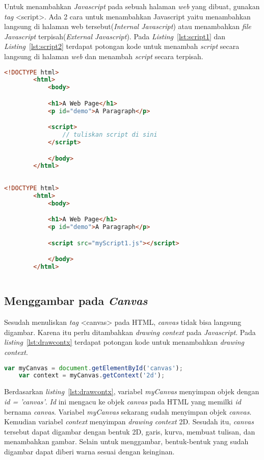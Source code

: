 Untuk menambahkan \textit{Javascript} pada sebuah halaman \textit{web} yang dibuat, gunakan \textit{tag} <script>. Ada 2 cara untuk menambahkan Javascript yaitu menambahkan langsung di halaman web tersebut(\textit{Internal Javascript}) atau menambahkan \textit{file Javascript} terpisah(\textit{External Javascript}). Pada \textit{Listing}~\ref{lst:script1} dan \textit{Listing}~\ref{lst:script2} terdapat potongan kode untuk menambah \textit{script} secara langsung di halaman \textit{web} dan menambah \textit{script} secara terpisah.

\begin{lstlisting}[language=HTML, caption=\textit{Internal Javascript}, label={lst:script1}]
	<!DOCTYPE html>
		<html>
			<body> 

			<h1>A Web Page</h1>
			<p id="demo">A Paragraph</p>

			<script>
				// tuliskan script di sini
			</script>

			</body>
		</html>
		
\end{lstlisting}

\begin{lstlisting}[language=HTML, caption=\textit{External Javascript}, label={lst:script2}]
	<!DOCTYPE html>
		<html>
			<body> 

			<h1>A Web Page</h1>
			<p id="demo">A Paragraph</p>

			<script src="myScript1.js"></script>

			</body>
		</html>
	
\end{lstlisting}

\subsection{Menggambar pada \textit{Canvas}}
Sesudah menuliskan \textit{tag} <canvas> pada HTML, \textit{canvas} tidak bisa langsung digambar. Karena itu perlu ditambahkan \textit{drawing context} pada \textit{Javascript}. Pada \textit{listing}~\ref{lst:drawcontx} terdapat potongan kode untuk menambahkan \textit{drawing context}.

\begin{lstlisting}[language=Javascript, caption=Menambahkan \textit{drawing context canvas}, label={lst:drawcontx} ]
	var myCanvas = document.getElementById('canvas');
	var context = myCanvas.getContext('2d');
\end{lstlisting}

Berdasarkan \textit{listing}~\ref{lst:drawcontx}, variabel \textit{myCanvas} menyimpan objek dengan \textit{id = 'canvas'}. \textit{Id} ini mengacu ke objek \textit{canvas} pada HTML yang memilki \textit{id} bernama \textit{canvas}. Variabel \textit{myCanvas} sekarang sudah menyimpan objek \textit{canvas}. Kemudian variabel \textit{context} menyimpan \textit{drawing context} 2D. Sesudah itu, \textit{canvas} tersebut dapat digambar dengan bentuk 2D, garis, kurva, membuat tulisan, dan menambahkan gambar. Selain untuk menggambar, bentuk-bentuk yang sudah digambar dapat diberi warna sesuai dengan keinginan.\\

